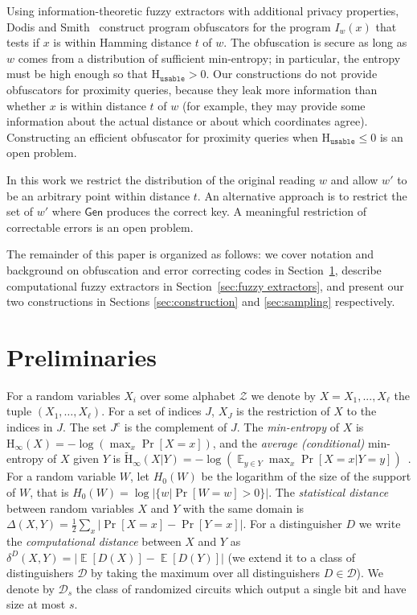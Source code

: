 \documentclass[11pt]{article}
\newcommand{\secref}[1]{\mbox{Section~\ref{#1}}}
\DeclareMathOperator*{\expe}{\mathbb{E}}
\newcommand{\class}[1]{{\ensuremath{\mathsf{#1}}}}
\newcommand{\gen}{\ensuremath{\class{Gen}}\xspace}
\newcommand{\Hoo}{\mathrm{H}_\infty}
\newcommand{\Hav}{\tilde{\mathrm{H}}_\infty}
\newcommand{\Huse}{\mathrm{H}_{\mathtt{usable}}}
\begin{document}
Using information-theoretic fuzzy extractors with additional privacy properties, Dodis and Smith~\cite[Section 5]{DBLP:conf/stoc/DodisS05} construct program obfuscators for the program $I_w(x)$ that tests if $x$ is within Hamming distance $t$ of $w$. The obfuscation is secure as long as $w$ comes from a distribution of sufficient min-entropy; in particular, the entropy must be high enough so that $\Huse>0$. Our constructions do not provide obfuscators for proximity queries, because they leak more information than whether $x$ is within distance $t$ of $w$ (for example, they may provide some information about the actual distance or about which coordinates agree). Constructing an efficient obfuscator for proximity queries when $\Huse\le 0$ is an open problem.

In this work we restrict the distribution of the original reading $w$ and allow $w'$ to be an arbitrary point within distance $t$.  An alternative approach is to restrict the set of $w'$ where $\gen$ produces the correct key.  A meaningful restriction of correctable errors is an open problem.

\medskip
The remainder of this paper is organized as follows: we cover notation and background on obfuscation and error correcting codes in \secref{sec:preliminaries}, describe computational fuzzy extractors in \secref{sec:fuzzy extractors}, and present our two constructions in Sections \ref{sec:construction} and \ref{sec:sampling} respectively.

\section{Preliminaries}
\label{sec:preliminaries}
For a random variables $X_i$ over some alphabet $\mathcal{Z}$ we denote by $X = X_1,..., X_\ell$  the tuple $(X_1,\dots, X_\ell)$.  For a set of indices $J$, $X_{J}$ is the restriction of $X$ to the indices in $J$.  The set $J^c$ is the complement of $J$.  The {\em min-entropy} of $X$ is $\Hoo(X) = -\log(\max_x \Pr[X=x])$,
and the {\em average (conditional)} min-entropy of $X$ given $Y$ is  $\Hav(X|Y) = -\log(\expe_{y\in Y} \max_{x} \Pr[X=x|Y=y])$~\cite[Section 2.4]{DBLP:journals/siamcomp/DodisORS08}.   For a random variable $W$, let $H_0(W)$ be the logarithm of the size of the support of $W$,  that is $H_0(W) = \log |\{w | \Pr[W=w]>0\}|$.
The {\em statistical distance} between random variables $X$ and $Y$ with the same domain is $\Delta(X,Y) = \frac12 \sum_x |\Pr[X=x] - \Pr[Y=x]|$.
For a distinguisher $D$ we write the \emph{computational distance} between $X$ and $Y$ as $\delta^D(X,Y) = \left| \expe[D(X)]-\expe[D(Y)]\right |$ (we extend it to a class of distinguishers $\mathcal{D}$ by taking the maximum over all distinguishers $D\in\mathcal{D}$).  We denote by $\mathcal{D}_{s}$ the class of randomized circuits which output a single bit and have size at most $s$.
\end{document}
